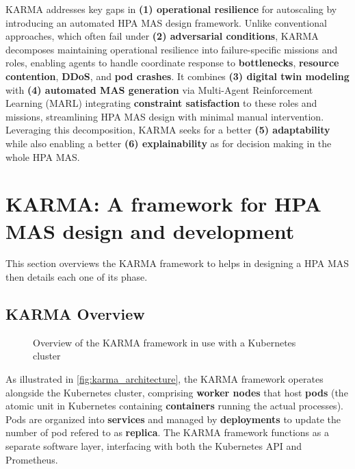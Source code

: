 KARMA addresses key gaps in \textbf{(1) operational resilience} for autoscaling by introducing an automated HPA MAS design framework. Unlike conventional approaches, which often fail under \textbf{(2) adversarial conditions}, KARMA decomposes maintaining operational resilience into failure-specific missions and roles, enabling agents to handle coordinate response to \textbf{bottlenecks}, \textbf{resource contention}, \textbf{DDoS}, and \textbf{pod crashes}. It combines \textbf{(3) digital twin modeling} with \textbf{(4) automated MAS generation} via Multi-Agent Reinforcement Learning (MARL) integrating \textbf{constraint satisfaction} to these roles and missions, streamlining HPA MAS design with minimal manual intervention. Leveraging this decomposition, KARMA seeks for a better \textbf{(5) adaptability} while also enabling a better \textbf{(6) explainability} as for decision making in the whole HPA MAS.


\section{KARMA: A framework for HPA MAS design and development}
\label{sec:proposed_approach}

This section overviews the KARMA framework to helps in designing a HPA MAS then details each one of its phase.

\subsection{KARMA Overview}

\begin{figure}[h!]
  \centering
  
  \caption{Overview of the KARMA framework in use with a Kubernetes cluster}
  \label{fig:karma_architecture}
\end{figure}

As illustrated in \autoref{fig:karma_architecture}, the KARMA framework operates alongside the Kubernetes cluster, comprising \textbf{worker nodes} that host \textbf{pods} (the atomic unit in Kubernetes containing \textbf{containers} running the actual processes). Pods are organized into \textbf{services} and managed by \textbf{deployments} to update the number of pod refered to as \textbf{replica}. The KARMA framework functions as a separate software layer, interfacing with both the Kubernetes API and Prometheus.

